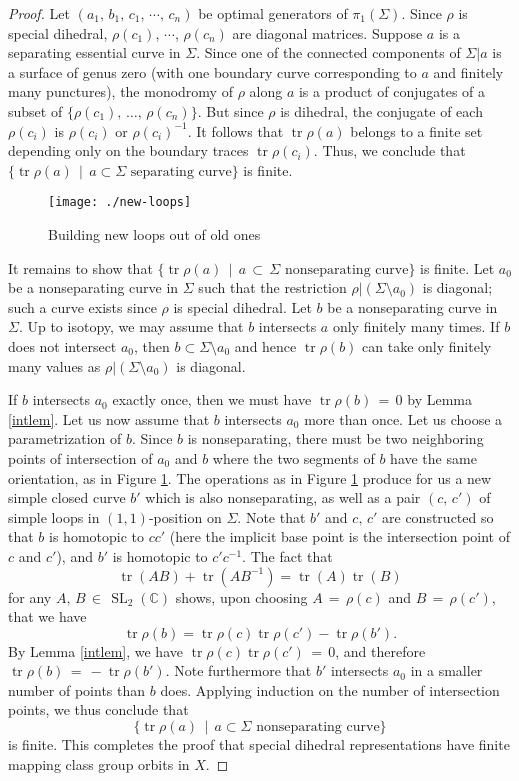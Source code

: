 \documentclass[reqno]{amsart}
\theoremstyle{plain}
\theoremstyle{definition}
\theoremstyle{remark}
\newcommand{\C}{{\mathbb{C}}}
\DeclareMathOperator{\SL}{SL}
\DeclareMathOperator{\tr}{tr}
\begin{document}
\begin{proof}
Let $(a_1,\,b_1,\,c_1,\,\cdots,\,c_n)$ be optimal generators of $\pi_1(\Sigma)$. Since $\rho$ is special 
dihedral, $\rho(c_1)$, $\cdots$, $\rho(c_n)$ are diagonal matrices. Suppose $a$ is a separating essential curve 
in $\Sigma$. Since one of the connected components of $\Sigma|a$ is a surface of genus zero (with one boundary 
curve corresponding to $a$ and finitely many punctures), the monodromy of $\rho$ along $a$ is a product of 
conjugates of a subset of $\{\rho(c_1),\,\dots,\,\rho(c_n)\}$. But since $\rho$ is dihedral, the conjugate of each 
$\rho(c_i)$ is $\rho(c_i)$ or $\rho(c_i)^{-1}$. It follows that $\tr\rho(a)$ belongs to a finite set depending 
only on the boundary traces $\tr\rho(c_i)$. Thus, we conclude that $\{\tr\rho(a)\,\mid\,a\subset\Sigma\text{ 
separating curve}\}$ is finite.

\begin{figure}[ht]
    \centering
    \texttt{[image: ./new-loops]}
    \caption{Building new loops out of old ones}
    \label{fig7}
\end{figure}

It remains to show that $\{\tr\rho(a)\,\mid\,a\,\subset\,\Sigma\text{ nonseparating curve}\}$ is finite. Let $a_0$ be a nonseparating curve in $\Sigma$ such that the restriction $\rho|(\Sigma\setminus a_0)$ is diagonal; such a curve exists since $\rho$ is special dihedral. Let $b$ be a nonseparating curve in $\Sigma$. Up to isotopy, we may assume that $b$ intersects $a$ only finitely many times. If $b$ does not intersect $a_0$, then $b\subset\Sigma\setminus a_0$ and hence $\tr\rho(b)$ can take only finitely many values as $\rho|(\Sigma\setminus a_0)$ is diagonal.

If $b$ intersects $a_0$ exactly once, then we must have $\tr\rho(b)\,=\,0$ by Lemma \ref{intlem}. Let us now
assume that $b$ intersects $a_0$ more than once. Let us choose a parametrization of $b$. Since $b$ is
nonseparating, there must be two neighboring points of intersection of $a_0$ and $b$ where the two segments
of $b$ have the same orientation, as in Figure \ref{fig7}. The operations as in Figure \ref{fig7} produce
for us a new simple closed curve $b'$ which is also nonseparating, as well as a pair $(c,\,c')$ of simple loops
in $(1,1)$-position on $\Sigma$. Note that $b'$ and $c,\,c'$ are constructed so that $b$ is homotopic to
$cc'$ (here the implicit base point is the intersection point of $c$ and $c'$), and $b'$ is homotopic
to $c'c^{-1}$. The fact that
$$\tr(AB)+\tr(AB^{-1})=\tr(A)\tr(B)$$
for any $A,\,B\,\in\,\SL_2(\C)$ shows, upon choosing $A\,=\,\rho(c)$ and $B\,=\,\rho(c')$, that we have
$$\tr\rho(b)=\tr\rho(c)\tr\rho(c')-\tr\rho(b').$$
By Lemma \ref{intlem}, we have $\tr\rho(c)\tr\rho(c')\,=\,0$, and therefore $\tr\rho(b)\,=\,-\tr\rho(b')$. Note
furthermore that $b'$ intersects $a_0$ in a smaller number of points than $b$ does. Applying induction
on the number of intersection points, we thus conclude that
$$\{\tr\rho(a)\,\mid\,a\subset\Sigma\text{ nonseparating curve}\}$$
is finite. This completes the proof that special dihedral representations have finite mapping class group 
orbits in $X$.
\end{proof}
\end{document}
